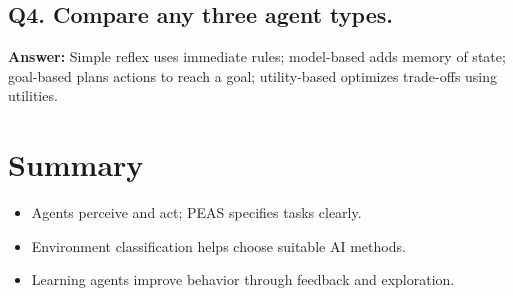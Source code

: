 \documentclass[11pt]{article}
\begin{document}
\subsection*{Q4. Compare any three agent types.}
\textbf{Answer:} Simple reflex uses immediate rules; model-based adds memory of state; goal-based plans actions to reach a goal; utility-based optimizes trade-offs using utilities.

\section{Summary}
\begin{itemize}[leftmargin=*]
  \item Agents perceive and act; PEAS specifies tasks clearly.
  \item Environment classification helps choose suitable AI methods.
  \item Learning agents improve behavior through feedback and exploration.
\end{itemize}
\notesources{\AIMLUnitISources}
\end{document}
